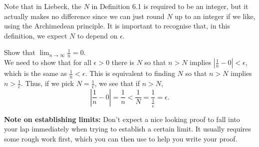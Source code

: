 \documentclass[11pt,dvipsnames]{book}
\numberwithin{equation}{section} %
\numberwithin{figure}{section} %
\numberwithin{table}{section} %
\begin{document}
\medskip
Note that in Liebeck, the $N$ in Definition 6.1 is required to be an integer, but it actually makes no difference since we can just round $N$ up to an integer if we like, using the Archimedean principle. It is important to recognise that, in this definition, we expect $N$ to depend on $\epsilon$.

\newcommand{\floor}[1]{\left\lfloor #1 \right\rfloor}
\newcommand{\ceil}[1]{\left\lceil #1 \right\rceil}


\begin{example}
Show that $\lim_{n\rightarrow \infty} \frac{1}{n}=0$. \\

We need to show that for all $\epsilon>0$ there is $N$ so that $n> N$ implies $|\frac{1}{n}-0|<\epsilon$, which is the same as $\frac{1}{n}<\epsilon$. This is equivalent to finding $N$ so that $n>N$ implies $n>\frac{1}{\epsilon}$. Thus, if we pick $N=\frac{1}{\epsilon}$, we see that if $n> N$,
\[
\left|\frac{1}{n} -0\right|=\frac{1}{n} < \frac{1}{N}= \frac{1}{\frac{1}{\epsilon}}=\epsilon.
\]
\end{example}

\begin{protip}
{\bf Note on establishing limits:} Don't expect a nice looking proof to fall into your lap immediately when trying to establish a certain limit. It usually requires some rough work first, which you can then use to help you write your proof.
\end{protip}
\end{document}
